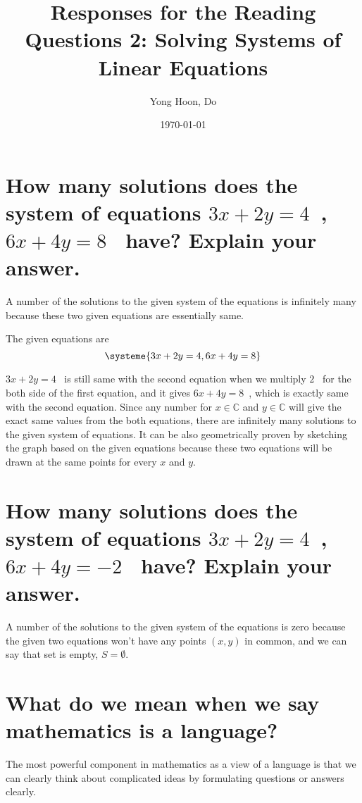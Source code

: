\documentclass{article}
\title{Responses for the Reading Questions 2: Solving Systems of Linear Equations}
\author{Yong Hoon, Do}
\date{\today}
\begin{document}
\maketitle



\section{How many solutions does the system of equations $3x+2y=4$~, $6x+4y=8$~ have? Explain your answer.}

A number of the solutions to the given system of the equations is infinitely many because these two given equations are essentially same.

\bigskip

The given equations are
\[
\systeme{
  3x+2y=4,
  6x+4y=8
}
\]

\bigskip

$3x+2y=4$~ is still same with the second equation when we multiply $2$~ for the both side of the first equation, and it gives $6x+4y=8$~, which is exactly same with the second equation. Since any number for $x\in\mathbb{C}$ and $y\in\mathbb{C}$ will give the exact same values from the both equations, there are infinitely many solutions to the given system of equations. It can be also geometrically proven by sketching the graph based on the given equations because these two equations will be drawn at the same points for every $x$ and $y$.




\section{How many solutions does the system of equations $3x+2y=4$~, $6x+4y=-2$~ have? Explain your answer.}

A number of the solutions to the given system of the equations is zero because the given two equations won’t have any points $(x,y)$ in common, and we can say that set is empty, $S = \emptyset$.


\section{What do we mean when we say mathematics is a language?}

The most powerful component in mathematics as a view of a language is that we can clearly think about complicated ideas by formulating questions or answers clearly.


\end{document}
